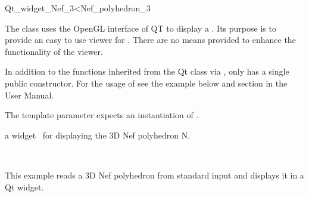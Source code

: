 
\ccRefPageBegin



\begin{ccRefClass}{Qt_widget_Nef_3<Nef_polyhedron_3}

\ccDefinition
 
The class  uses the OpenGL interface of QT to display a
. Its purpose is to provide an easy to use viewer for 
. There are no means provided to enhance the 
functionality of the viewer.

In addition to the functions inherited from the Qt class  via 
,  only has a single public 
constructor. For the usage of  see the example 
below and section  in the User Manual.


\ccParameters
The template parameter expects an instantiation of .
 
\ccInheritsFrom
{}

\ccCreation
{}

{a widget \ccVar\ for displaying the 3D Nef polyhedron N.}

\ccSeeAlso

\\

\ccExample
This example reads a 3D Nef polyhedron from standard input and displays it
in a Qt widget.


\end{ccRefClass}

\ccRefPageEnd

